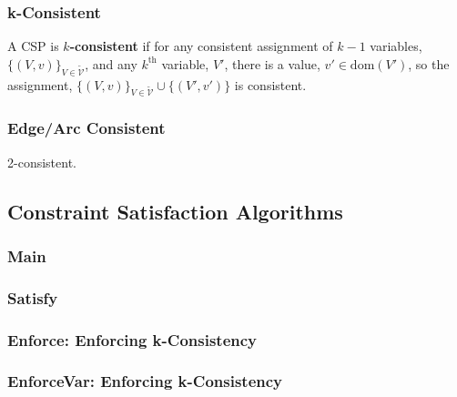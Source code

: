 \subsubsection{k-Consistent}
\begin{definition}
    A CSP is \textbf{\(k\)-consistent} if for any consistent assignment of \(k - 1\) variables, \(\{(V, v)\}_{V \in \tilde{\mathcal{V}}}\), and any \(k^\text{th}\) variable, \(V'\), there is a value, \(v' \in \text{dom}(V')\), so the assignment, \(\{(V, v)\}_{V \in \tilde{\mathcal{V}}} \cup \{(V', v')\}\) is consistent.
\end{definition}

\subsubsection{Edge/Arc Consistent}
\begin{definition}
    2-consistent.
\end{definition}
\newpage

\subsection{Constraint Satisfaction Algorithms}
\subsubsection{Main}
\begin{algo}

\end{algo}

\subsubsection{Satisfy}
\begin{algo}

\end{algo}

\subsubsection{Enforce: Enforcing k-Consistency}
\begin{algo}

\end{algo}

\subsubsection{EnforceVar: Enforcing k-Consistency}
\begin{algo}

\end{algo}
\newpage

